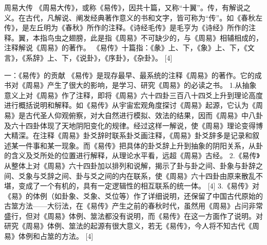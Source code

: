 \documentclass[12pt,UTF8]{ctexbook}
\begin{document}
周易大传
《周易大传》，或称《易传》，因共十篇，又称“十翼”。传，有解说之义。在古代，凡解说、阐发经典著作意义的书和文字，皆可称为“传”。如《春秋左传》，是左丘明为《春秋》所作的注释。《诗经毛传》是毛亨为《诗经》所作的注释。翼，本指鸟虫之翅膀，此是指《周易》不可缺少的，与《周易》相辅相成的，注释解说《周易》的著作。
《易传》十篇指：《彖》上、下，《象》上、下，《文言》，《系辞》上、下，《说卦》，《序卦》，《杂卦》。 [4]

一：《易传》的贡献
《易传》是现存最早、最系统的注释《周易》的著作。它的成书对《周易》产生了很大的影响，是学习、研究《周易》的必读之书。
1.从抽象意义上对《周易》作了注释，即将《周易》六十四卦三百八十四爻上升到理论高度进行概括说明和解释。如《易传》从宇宙宏观角度探讨《周易》起源，它认为《周易》是古代圣人仰观俯察，对大自然进行模拟、效法的结果，因而《周易》中八卦及六十四卦体现了天地阴阳变化的规律。经过这样一解说，使《周易》理论变得博大精深。在注释《周易》卦爻辞时联系卦爻画注释，《周易》卦爻辞多是记录和叙述某一件事和某一现象。而《易传》把具体的卦爻辞上升到抽象的阴阳关系，从卦的含义及爻所处的位置进行解释，从理论水平看，远超《周易》古经。
2.《易传》从整体上对《周易》六十四卦加以排列和说解，揭示了卦与卦之间、卦象与卦辞之间、爻象与爻辞之间、卦与爻之间的内在联系，使《周易》六十四卦由原来散乱不堪，变成了一个有机的，具有一定逻辑性的相互联系的统一体。 [4]
3.《易传》对《易》的体例（如卦象、爻象、爻位等）作了详细说明，还保留了中国古代原始的古筮方法——大衍法，在《易传》产生之前的春秋时代，虽然用《周易》占问非常盛行，但对《周易》体例、筮法都没有说明，而《易传》在这一方面作了说明。对研究《周易》体例、筮法的起源有很大意义，若无《易传》，今人将不知古代《周易》体例和占筮的方法。 [4]
\end{document}
